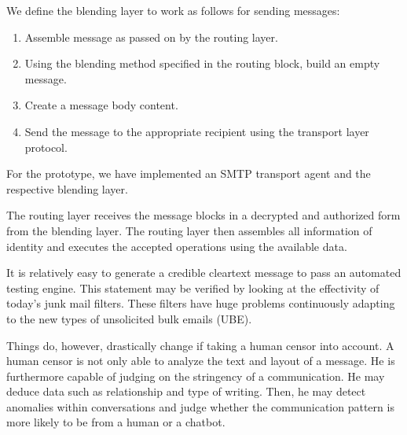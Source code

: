 \documentclass[acmsmall, screen, review]{acmart}
\begin{document}
	We define the blending layer to work as follows for sending messages:
	\begin{enumerate}
		\item Assemble message as passed on by the routing layer.
		\item Using the blending method specified in the routing block, build an empty message. 
		\item Create a message body content.
		\item Send the message to the appropriate recipient using the transport layer protocol.
	\end{enumerate}
	
	For the prototype, we have implemented an SMTP transport agent and the respective blending layer.
	
	The routing layer receives the message blocks in a decrypted and authorized form from the blending layer. The routing layer then assembles all information of identity and executes the accepted operations using the available data. 
	
	It is relatively easy to generate a credible cleartext message to pass an automated testing engine. This statement may be verified by looking at the effectivity of today's junk mail filters. These filters have huge problems continuously adapting to the new types of unsolicited bulk emails (UBE).
	
	Things do, however, drastically change if taking a human censor into account. A human censor is not only able to analyze the text and layout of a message. He is furthermore capable of judging on the stringency of a communication. He may deduce data such as relationship and type of writing. Then, he may detect anomalies within conversations and judge whether the communication pattern is more likely to be from a human or a chatbot.
	
\end{document}
